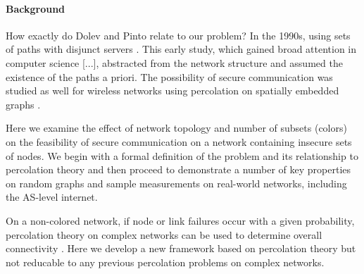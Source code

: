 \documentclass[aps, pre, twocolumn, a4paper, superscriptaddress, floatfix]{revtex4}
\begin{document}
\paragraph{Background}

{ \color{red} How exactly do Dolev and Pinto relate to our problem? }
In the 1990s, using sets of paths with disjunct servers \cite{dolev-acm1993}.
This early study, which gained broad attention in computer science [...],
abstracted from the network structure and assumed the existence of the paths a priori. 
The possibility of secure communication was studied as
well for wireless networks using percolation on spatially embedded
graphs \cite{pinto-ieee2012}. 


Here we examine the effect of network topology and number of subsets (colors) on the feasibility of secure communication on a network containing insecure sets of nodes.  
We begin with a formal definition of the problem and its relationship to percolation theory and then proceed to demonstrate a number of key properties on random graphs and sample measurements on real-world networks, including the AS-level internet.

On a non-colored network, if node or link failures occur with a given probability, 
percolation theory on complex networks can be used to determine overall connectivity \cite{cohen-book2010,newman-book2010}. 
Here we develop a new framework based on percolation theory but not reducable to any previous percolation problems on complex networks.


\end{document}
